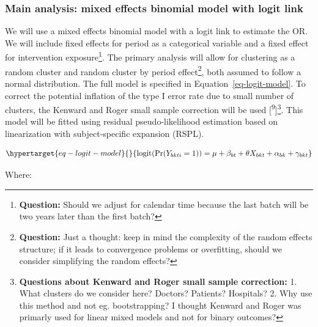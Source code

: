 \documentclass[
]{scrartcl}
\begin{document}
\hypertarget{main-analysis-mixed-effects-binomial-model-with-logit-link}{%
\subsubsection{Main analysis: mixed effects binomial model with logit
link}\label{main-analysis-mixed-effects-binomial-model-with-logit-link}}

We will use a mixed effects binomial model with a logit link to estimate
the OR. We will include fixed effects for period as a categorical
variable and a fixed effect for intervention exposure\footnote{\textbf{Question:}
  Should we adjust for calendar time because the last batch will be two
  years later than the first batch?}. The primary analysis will allow
for clustering as a random cluster and random cluster by period
effect\footnote{\textbf{Question:} Just a thought: keep in mind the
  complexity of the random effects structure; if it leads to convergence
  problems or overfitting, should we consider simplifying the random
  effects?}, both assumed to follow a normal distribution. The full
model is specified in Equation~\ref{eq-logit-model}. To correct the
potential inflation of the type I error rate due to small number of
clusters, the Kenward and Roger small sample correction will be used
{[}\textsuperscript{9}{]}\footnote{\textbf{Questions about Kenward and
  Roger small sample correction:} 1. What clusters do we consider here?
  Doctors? Patients? Hospitals? 2. Why use this method and not eg.
  bootstrapping? I thought Kenward and Roger was primarly used for
  linear mixed models and not for binary outcomes?}. This model will be
fitted using residual pseudo-likelihood estimation based on
linearization with subject-specific expansion (RSPL).

\begin{equation}\protect\hypertarget{eq-logit-model}{}{
\text{logit}(\text{Pr}(Y_{bkti} = 1)) = \mu + \beta_{bt} + \theta X_{bkt} + \alpha_{bk} + \gamma_{bkt} 
}\label{eq-logit-model}\end{equation}

Where:
\end{document}
